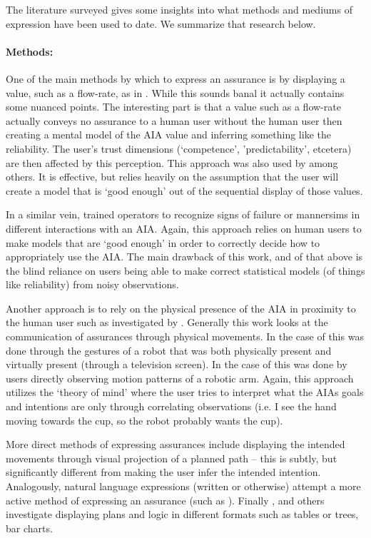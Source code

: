     The literature surveyed gives some insights into what methods and mediums of expression have been used to date. We summarize that research below.

    \paragraph{Methods:} One of the main methods by which to express an assurance is by displaying a value, such as a flow-rate, as in \cite{Muir1996-gt}. While this sounds banal it actually contains some nuanced points. The interesting part is that a value such as a flow-rate actually conveys no assurance to a human user without the human user then creating a mental model of the AIA value and inferring something like the reliability. The user's trust dimensions (`competence', 'predictability', etcetera) are then affected by this perception. This approach was also used by \cite{Wickens1999-la,Sheridan1984-kx,Hutchins2015-if} among others. It is effective, but relies heavily on the assumption that the user will create a model that is `good enough' out of the sequential display of those values.

    In a similar vein, \cite{Freedy2007-sg,Desai2012-rc,Salem2015-md} trained operators to recognize signs of failure or mannersims in different interactions with an AIA. Again, this approach relies on human users to make models that are `good enough' in order to correctly decide how to appropriately use the AIA. The main drawback of this work, and of that above is the blind reliance on users being able to make correct statistical models (of things like reliability) from noisy observations.

    Another approach is to rely on the physical presence of the AIA in proximity to the human user such as investigated by \cite{Bainbridge2011-pl, Dragan2013-wd}. Generally this work looks at the communication of assurances through physical movements. In the case of \cite{Bainbridge2011-pl} this was done through the gestures of a robot that was both physically present and virtually present (through a television screen). In the case of \cite{Dragan2013-wd} this was done by users directly observing motion patterns of a robotic arm. Again, this approach utilizes the `theory of mind' where the user tries to interpret what the AIAs goals and intentions are only through correlating observations (i.e. I see the hand moving towards the cup, so the robot probably wants the cup).

    More direct methods of expressing assurances include displaying the intended movements through visual projection of a planned path \cite{Chadalavada2015-wx} -- this is subtly, but significantly different from making the user infer the intended intention. Analogously, natural language expressions (written or otherwise) attempt a more active method of expressing an assurance (such as \cite{Wang2016-id}). Finally 
    \cite{Van_Belle2013-ph, Huysmans2011-th, Hutchins2015-if}, and others investigate displaying plans and logic in different formats such as tables or trees, bar charts.

